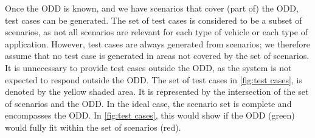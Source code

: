 
Once the ODD is known, and we have scenarios that cover (part of) the ODD, test cases can be generated. The set of test cases is considered to be a subset of scenarios, as not all scenarios are relevant for each type of vehicle or each type of application. However, test cases are always generated from scenarios; we therefore assume that no test case is generated in areas not covered by the set of scenarios. It is unnecessary to provide test cases outside the ODD, as the system is not expected to respond outside the ODD. The set of test cases in \cref{fig:test cases}, is denoted by the yellow shaded area. It is represented by the intersection of the set of scenarios and the ODD. In the ideal case, the scenario set is complete and encompasses the ODD. In \cref{fig:test cases}, this would show if the ODD (green) would fully fit within the set of scenarios (red).

